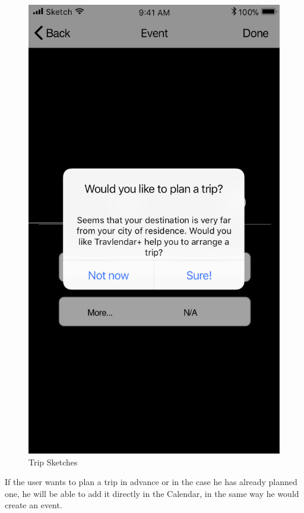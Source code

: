 \begin{enumerate}
\begin{figure}[H]
				\includegraphics[scale=0.25]{Images/Sketch/Trip_3}
				\caption{Trip Sketches}
			\end{figure}
			If the user wants to plan a trip in advance or in the case he has already planned one, he will be able to add it directly in the Calendar, in the same way he would create an event.
			\begin{figure}[H]
				\centering

\end{figure}
\end{enumerate}
